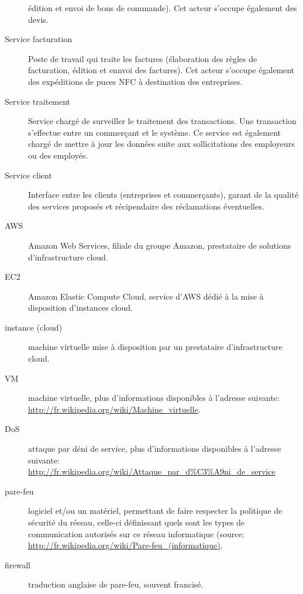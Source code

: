 \begin{description}
    édition et envoi de bons de commande). Cet acteur s’occupe également des
    devis.
  \item[Service facturation] Poste de travail qui traite les factures
    (élaboration des règles de facturation, édition et ennvoi des factures).
    Cet acteur s’occupe également des expéditions de puces NFC à destination
    des entreprises.
  \item[Service traitement] Service chargé de surveiller le traitement des
    transactions. Une transaction s’effectue entre un commerçant et le système.
    Ce service est également chargé de mettre à jour les données suite aux
    sollicitations des employeurs ou des employés.
  \item[Service client] Interface entre les clients (entreprises
    et commerçants), garant de la qualité des services proposés et récipendaire
    des réclamations éventuelles.
  \item[AWS] Amazon Web Services, filiale du groupe Amazon, prestataire de
    solutions d'infrastructure cloud.
  \item[EC2] Amazon Elastic Compute Cloud, service d'AWS dédié à la mise à
    disposition d'instances cloud.
  \item[instance (cloud)] machine virtuelle mise à disposition par un
    prestataire d'infrastructure cloud.
  \item[VM] machine virtuelle, plus d'informations disponibles à l'adresse
    suivante: \url{http://fr.wikipedia.org/wiki/Machine_virtuelle}.
  \item[DoS] attaque par déni de service, plus d'informations disponibles à
    l'adresse suivante:
    \url{http://fr.wikipedia.org/wiki/Attaque_par_d\%C3\%A9ni_de_service}
  \item[pare-feu]  logiciel et/ou un matériel, permettant de faire respecter la
    politique de sécurité du réseau, celle-ci définissant quels sont les types
    de communication autorisés sur ce réseau informatique (source:
    \url{http://fr.wikipedia.org/wiki/Pare-feu_(informatique)}.
  \item[firewall] traduction anglaise de pare-feu, souvent francisé.
\end{description}



